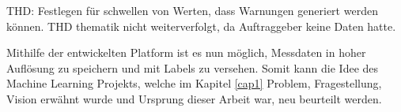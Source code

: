 THD: Festlegen für schwellen von Werten, dass Warnungen generiert werden können.
THD thematik nicht weiterverfolgt, da Auftraggeber keine Daten hatte.

Mithilfe der entwickelten Platform ist es nun möglich, Messdaten in hoher Auflösung zu speichern
und mit Labels zu versehen.
Somit kann die Idee des Machine Learning Projekts, welche im Kapitel \ref{cap1} Problem, Fragestellung, Vision erwähnt wurde und Ursprung dieser
Arbeit war, neu beurteilt werden.


